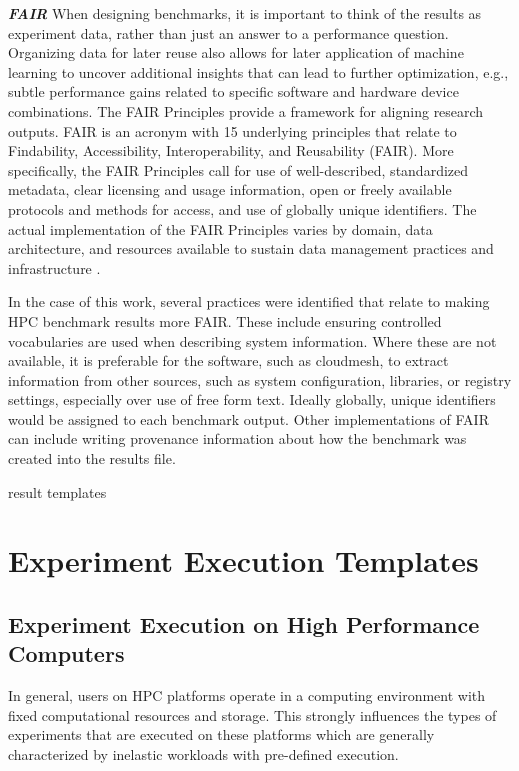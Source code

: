 \documentclass[utf8]{FrontiersinVancouver} %
\begin{document}
\textbf{\textit{FAIR}}
When designing benchmarks, it is important to think of the results as experiment data, rather than just an answer to a performance question. Organizing data for later reuse also allows for later application of machine learning to uncover additional insights that can lead to further optimization, e.g., subtle performance gains related to specific software and hardware device combinations. The FAIR Principles provide a framework for aligning research outputs. FAIR is an acronym with 15 underlying principles that relate to Findability, Accessibility, Interoperability, and Reusability (FAIR)\citep{wilkinson2016fair}. More specifically, the FAIR Principles call for use of well-described, standardized metadata, clear licensing and usage information, open or freely available protocols and methods for access, and use of globally unique identifiers. The actual implementation of the FAIR Principles varies by domain, data architecture, and resources available to sustain data management practices and infrastructure \citep{jacobsen2020fair}.

In the case of this work, several practices were identified that relate to making HPC benchmark results more FAIR\citep{kirkpatrick2024}. These include ensuring controlled vocabularies are used when describing system information. Where these are not available, it is preferable for the software, such as cloudmesh, to extract information from other sources, such as system configuration, libraries, or registry settings, especially over use of free form text. Ideally globally, unique identifiers would be assigned to each benchmark output. Other implementations of FAIR can include writing provenance information about how the benchmark was created into the results file.

result templates


\section{Experiment Execution Templates}

\subsection{Experiment Execution on High Performance Computers}
In general, users on HPC platforms operate in a computing environment with
fixed computational resources and storage. This strongly influences the types
of experiments that are executed on these platforms which are generally
characterized by inelastic workloads with pre-defined execution.
\end{document}
